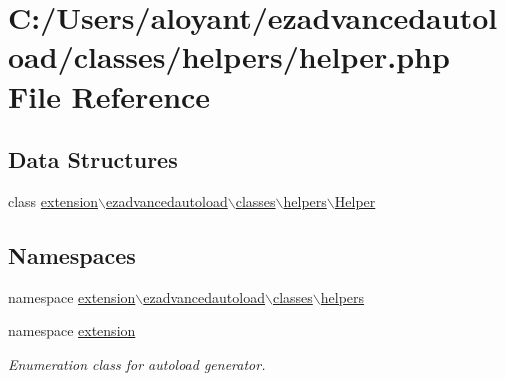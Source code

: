 \hypertarget{helper_8php}{\section{C\-:/\-Users/aloyant/ezadvancedautoload/classes/helpers/helper.php File Reference}
\label{helper_8php}
}
\subsection*{Data Structures}
\begin{DoxyCompactItemize}
\item 
class \hyperlink{classextension_1_1ezadvancedautoload_1_1classes_1_1helpers_1_1_helper}{extension$\backslash$ezadvancedautoload$\backslash$classes$\backslash$helpers$\backslash$\-Helper}
\end{DoxyCompactItemize}
\subsection*{Namespaces}
\begin{DoxyCompactItemize}
\item 
namespace \hyperlink{namespaceextension_1_1ezadvancedautoload_1_1classes_1_1helpers}{extension$\backslash$ezadvancedautoload$\backslash$classes$\backslash$helpers}
\item 
namespace \hyperlink{namespaceextension}{extension}
\begin{DoxyCompactList}\small\item\em Enumeration class for autoload generator. \end{DoxyCompactList}\end{DoxyCompactItemize}
